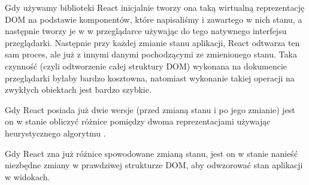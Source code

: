\begin{description}
  Gdy używamy biblioteki React inicjalnie tworzy ona taką wirtualną reprezentację DOM na podstawie komponentów, które napisaliśmy i zawartego w nich stanu, a następnie tworzy je w w przeglądarce używając do tego natywnego interfejsu przeglądarki. Następnie przy każdej zmianie stanu aplikacji, React odtwarza ten sam proces, ale już z innymi danymi pochodzącymi ze zmienionego stanu. Taka czynność (czyli odtworzenie całej struktury DOM) wykonana na dokumencie przeglądarki byłaby bardzo kosztowna, natomiast wykonanie takiej operacji na zwykłych obiektach jest bardzo szybkie. 

  Gdy React posiada już dwie wersje (przed zmianą stanu i po jego zmianie) jest on w stanie obliczyć różnice pomiędzy dwoma reprezentacjami używając heurystycznego algorytmu \cite{ref_heuristic_diffing_algorythm}.

  Gdy React zna już różnice spowodowane zmianą stanu, jest on w stanie nanieść niezbędne zmiany w prawdziwej strukturze DOM, aby odwzorować stan aplikacji w widokach.
\end{description}

